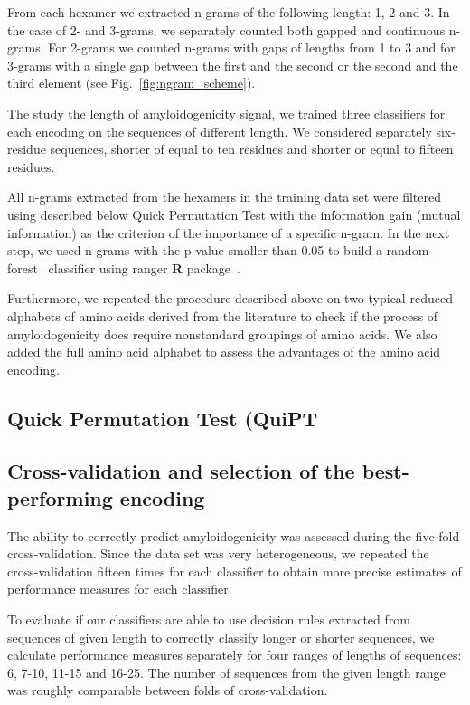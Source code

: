 \documentclass{bioinfo}
\begin{document}
\begin{methods}
  From each hexamer we extracted n-grams of the following length: 1, 2 and 3. In 
the case of 2- and 3-grams, we separately counted both gapped and continuous 
n-grams. For 2-grams we counted n-grams with gaps of lengths from 1 to 3 and for 
3-grams with a single gap between the first and the second or the second and the 
third element (see Fig.~\ref{fig:ngram_scheme}).

  The study the length of amyloidogenicity signal, we trained three 
classifiers for each encoding on the sequences of different length. We 
considered separately six-residue sequences, shorter of equal to ten residues 
and shorter or equal to fifteen residues.

  All n-grams extracted from the hexamers in the training data set were filtered 
using described below Quick Permutation Test with the information gain (mutual 
information) as the criterion of the importance of a specific n-gram. In the 
next step, we used n-grams with the p-value smaller than 0.05 to build a random 
forest~\citep{breiman_random_2001} classifier using ranger \textbf{R} 
package~\citep{wright_ranger:_2015}. 

  Furthermore, we repeated the procedure described above on two typical reduced 
alphabets of amino acids derived from the literature to check if the process of 
amyloidogenicity does require nonstandard groupings of amino acids. We also 
added the full amino acid alphabet to assess the advantages of the amino acid 
encoding.

\subsection{Quick Permutation Test (QuiPT}



\subsection{Cross-validation and selection of the best-performing encoding}

The ability to correctly predict amyloidogenicity was assessed during the 
five-fold cross-validation. Since the data set was very heterogeneous, we 
repeated the cross-validation fifteen times for each classifier to obtain more 
precise estimates of performance measures for each classifier. 

  To evaluate if our classifiers are able to use decision rules extracted from 
sequences of given length to correctly classify longer or shorter sequences, we 
calculate performance measures separately for four ranges of lengths of 
sequences: 6, 7-10, 11-15 and 16-25. The number of sequences from the given 
length range was roughly comparable between folds of cross-validation.
  

\end{methods}
\end{document}
